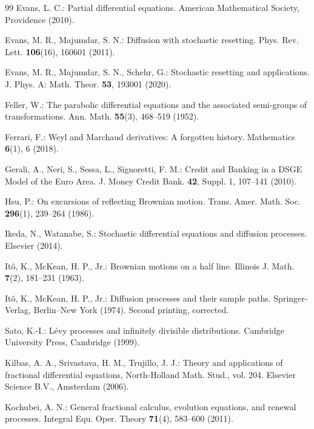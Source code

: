 \documentclass[11pt,a4paper]{article}
\theoremstyle{plain}
\theoremstyle{definition}
\theoremstyle{remark}
\begin{document}
\begin{thebibliography}{99}
			Evans, L. C.:
			Partial differential equations. American Mathematical Society, Providence (2010).
			
			Evans, M. R., Majumdar, S. N.:
			Diffusion with stochastic resetting. Phys. Rev. Lett. \textbf{106}(16), 160601 (2011).
			
			Evans, M. R., Majumdar, S. N., Schehr, G.:
			Stochastic resetting and applications. J. Phys. A: Math. Theor. \textbf{53}, 193001 (2020).
			
			Feller, W.:
			The parabolic differential equations and the associated semi-groups of transformations. Ann. Math. \textbf{55}(3), 468--519 (1952).
			
			Ferrari, F.:
			Weyl and Marchaud derivatives: A forgotten history. Mathematics \textbf{6}(1), 6 (2018).
			
			Gerali, A., Neri, S., Sessa, L., Signoretti, F. M.:
			Credit and Banking in a DSGE Model of the Euro Area. J. Money Credit Bank. \textbf{42}, Suppl. 1, 107--141 (2010).
			
			Hsu, P.:
			On excursions of reflecting Brownian motion. Trans. Amer. Math. Soc. \textbf{296}(1), 239--264 (1986).
			
			Ikeda, N., Watanabe, S.:
			Stochastic differential equations and diffusion processes. Elsevier (2014).
			
			It\^{o}, K., McKean, H. P., Jr.:
			Brownian motions on a half line. Illinois J. Math. \textbf{7}(2), 181--231 (1963).
			
			It\^{o}, K., McKean, H. P., Jr.:
			Diffusion processes and their sample paths. Springer-Verlag, Berlin--New York (1974). Second printing, corrected.
			
			Sato, K.-I.:
			L\'evy processes and infinitely divisible distributions. Cambridge University Press, Cambridge (1999).
			
			Kilbas, A. A., Srivastava, H. M., Trujillo, J. J.:
			Theory and applications of fractional differential equations, North-Holland Math. Stud., vol. 204. Elsevier Science B.V., Amsterdam (2006).
			
			Kochubei, A. N.:
			General fractional calculus, evolution equations, and renewal processes. Integral Equ. Oper. Theory \textbf{71}(4), 583--600 (2011).
			

\end{thebibliography}
\end{document}
